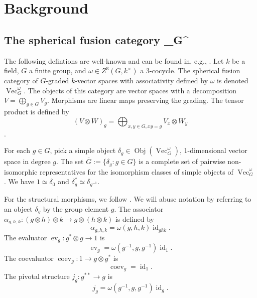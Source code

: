 \documentclass{amsart}
\DeclareMathOperator{\id}{id}
\DeclareMathOperator{\Vect}{Vec}
\DeclareMathOperator{\Obj}{Obj}
\DeclareMathOperator{\coev}{coev}
\DeclareMathOperator{\ev}{ev}
\newcommand{\one}{1}
\begin{document}
\section{Background}
\subsection{The spherical fusion category \Vect_G^\omega}
The following defintions are well-known and can be found in, e.g., \cite{etingofTensor}.  Let $k$ be a field,  $G$ a finite group, and $\omega \in Z^3(G, k^\times)$ a 3-cocycle.    The spherical fusion category of $G$-graded $k$-vector spaces with associativity defined by $\omega$ is denoted $\Vect_G^\omega$.  The objects of this category are vector spaces with a decomposition $V = \bigoplus_{g \in G} V_g$. Morphisms are linear maps preserving the grading. The tensor product is defined by
$$ (V \otimes W)_g = \bigoplus_{x,y \in G, xy = g} V_x \otimes W_y $$.


For each $g \in G$, pick a simple object $\delta_g \in \Obj(\Vect_G^\omega)$,  1-dimensional vector space in degree $g$.  The set $\overline{G} := \{\delta_g : g \in G\}$ is a complete set of pairwise non-isomorphic representatives for the isomorphism classes of simple objects of $\Vect_G^\omega$.  We have $\one \simeq \delta_0$ and $\delta_g^* \simeq \delta_{g^{-1}}$.

For the structural morphisms,  we follow \cite{math/0601012}.  We will abuse notation by referring to an object $\delta_g$ by the group element $g$.  The associator $\alpha_{g,h,k}:(g \otimes h) \otimes k \to g \otimes (h \otimes k)$ is defined by
$$\alpha_{g,h,k} = \omega(g,h,k) \id_{{ghk}}.$$ 
The evaluator $\ev_g:g^* \otimes g \to 1$ is 
$$\ev_{g} = \omega(g^{-1},g,g^{-1}) \id_1.$$  
The coevaluator $\coev_g:1 \to g \otimes g^*$ is 
$$\coev_{g} = \id_1.$$ 
The pivotal structure $j_g:g^{**} \to g$ is 
$$j_{g} = \omega(g^{-1},g,g^{-1}) \id_{g}.$$

\newcommand{\ee}{\mathbf{e}}       %
\newcommand{\A}{\mathcal{A}}      %
\newcommand{\st}{\; | \;}                               %
\newcommand{\ttt}{\otimes}                              %
\newcommand{\cc}[1]{\underset{\scriptstyle #1}{\circ}}
\newcommand{\ccc}[1]{\underset{\scriptstyle #1}{\bullet}}
\newcommand{\ti}{\tilde}
\newcommand{\ov}{\overline}
\newcommand{\del}{\partial}
\newcommand{\<}{\langle}
\renewcommand{\>}{\rangle}
\newcommand{\surjto}{\twoheadrightarrow}      %
\newcommand{\injto}{\hookrightarrow}          %
\newcommand{\isoto}{\xrightarrow{\sim}}       %
\newcommand{\xxto}{\xrightarrow}              %
\newcommand{\firef}[1]{Figure~{\rm\ref{#1}}}
\newcommand{\R}{\mathbb{R}}       %
\end{document}
